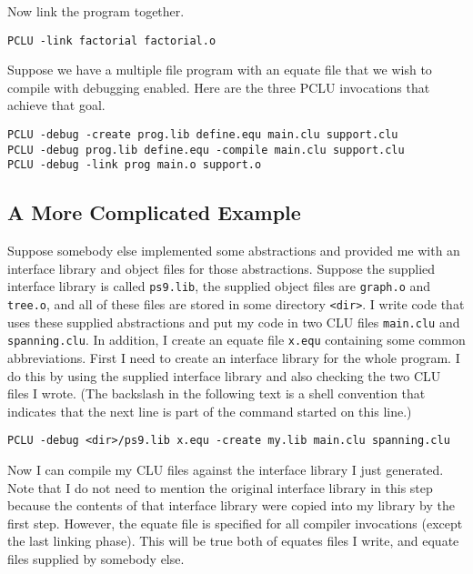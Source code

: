 \noindent Now link the program together.

\begin{indenttext}
\verb|PCLU -link factorial factorial.o|
\end{indenttext}

\noindent Suppose we have a multiple file program with an equate file that we
wish to compile with debugging enabled. Here are the three PCLU
invocations that achieve that goal.

\begin{indenttext}
  \verb|PCLU -debug -create prog.lib define.equ main.clu support.clu|\\
  \verb|PCLU -debug prog.lib define.equ -compile main.clu support.clu|\\
  \verb|PCLU -debug -link prog main.o support.o|
\end{indenttext}

\subsection{A More Complicated Example}

Suppose somebody else implemented some abstractions and provided me
with an interface library and object files for those abstractions.
Suppose the supplied interface library is called \verb|ps9.lib|, the
supplied object files are \verb|graph.o| and \verb|tree.o|, and all of
these files are stored in some directory \verb|<dir>|. I write code
that uses these supplied abstractions and put my code in two CLU files
\verb|main.clu| and \verb|spanning.clu|. In addition, I create an
equate file \verb|x.equ| containing some common abbreviations. First I
need to create an interface library for the whole program. I do this
by using the supplied interface library and also checking the two CLU
files I wrote. (The backslash in the following text is a shell
convention that indicates that the next line is part of the command
started on this line.)

\begin{indenttext}
\begin{verbatim}
PCLU -debug <dir>/ps9.lib x.equ -create my.lib main.clu spanning.clu
\end{verbatim}
\end{indenttext}

\noindent Now I can compile my CLU files against the interface library
I just generated. Note that I do not need to mention the original
interface library in this step because the contents of that interface
library were copied into my library by the first step. However, the
equate file is specified for all compiler invocations (except the last
linking phase). This will be true both of equates files I write, and
equate files supplied by somebody else.

